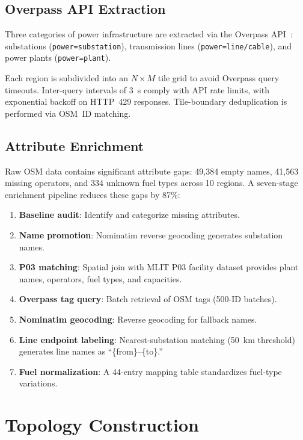 \documentclass[journal]{IEEEtran}
\begin{document}
\subsection{Overpass API Extraction}
Three categories of power infrastructure are extracted via the Overpass API~\cite{overpass}: substations (\texttt{power=substation}), transmission lines (\texttt{power=line/cable}), and power plants (\texttt{power=plant}).

Each region is subdivided into an $N \times M$ tile grid to avoid Overpass query timeouts. Inter-query intervals of 3~s comply with API rate limits, with exponential backoff on HTTP~429 responses. Tile-boundary deduplication is performed via OSM~ID matching.

\subsection{Attribute Enrichment}
Raw OSM data contains significant attribute gaps: 49,384 empty names, 41,563 missing operators, and 334 unknown fuel types across 10 regions. A seven-stage enrichment pipeline reduces these gaps by 87\%:

\begin{enumerate}
  \item \textbf{Baseline audit}: Identify and categorize missing attributes.
  \item \textbf{Name promotion}: Nominatim reverse geocoding generates substation names.
  \item \textbf{P03 matching}: Spatial join with MLIT P03 facility dataset provides plant names, operators, fuel types, and capacities.
  \item \textbf{Overpass tag query}: Batch retrieval of OSM tags (500-ID batches).
  \item \textbf{Nominatim geocoding}: Reverse geocoding for fallback names.
  \item \textbf{Line endpoint labeling}: Nearest-substation matching (50~km threshold) generates line names as ``\{from\}--\{to\}.''
  \item \textbf{Fuel normalization}: A 44-entry mapping table standardizes fuel-type variations.
\end{enumerate}

\section{Topology Construction}
\end{document}
